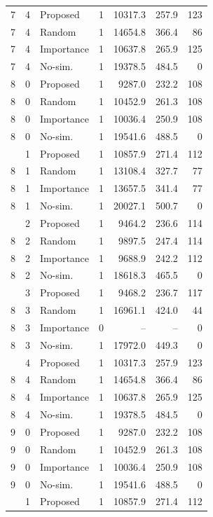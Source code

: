 \begin{table}[t]
\begin{tabular}{cc l c r r r}
7 & 4 & Proposed & 1 & 10317.3 & 257.9 & 123 \\
7 & 4 & Random & 1 & 14654.8 & 366.4 & 86 \\
7 & 4 & Importance & 1 & 10637.8 & 265.9 & 125 \\
7 & 4 & No-sim. & 1 & 19378.5 & 484.5 & 0 \\
\midrule
8 & 0 & Proposed & 1 & 9287.0 & 232.2 & 108 \\
8 & 0 & Random & 1 & 10452.9 & 261.3 & 108 \\
8 & 0 & Importance & 1 & 10036.4 & 250.9 & 108 \\
8 & 0 & No-sim. & 1 & 19541.6 & 488.5 & 0 \\
\addlinespace[1pt]
8 & 1 & Proposed & 1 & 10857.9 & 271.4 & 112 \\
8 & 1 & Random & 1 & 13108.4 & 327.7 & 77 \\
8 & 1 & Importance & 1 & 13657.5 & 341.4 & 77 \\
8 & 1 & No-sim. & 1 & 20027.1 & 500.7 & 0 \\
\addlinespace[1pt]
8 & 2 & Proposed & 1 & 9464.2 & 236.6 & 114 \\
8 & 2 & Random & 1 & 9897.5 & 247.4 & 114 \\
8 & 2 & Importance & 1 & 9688.9 & 242.2 & 112 \\
8 & 2 & No-sim. & 1 & 18618.3 & 465.5 & 0 \\
\addlinespace[1pt]
8 & 3 & Proposed & 1 & 9468.2 & 236.7 & 117 \\
8 & 3 & Random & 1 & 16961.1 & 424.0 & 44 \\
8 & 3 & Importance & 0 & -- & -- & 0 \\
8 & 3 & No-sim. & 1 & 17972.0 & 449.3 & 0 \\
\addlinespace[1pt]
8 & 4 & Proposed & 1 & 10317.3 & 257.9 & 123 \\
8 & 4 & Random & 1 & 14654.8 & 366.4 & 86 \\
8 & 4 & Importance & 1 & 10637.8 & 265.9 & 125 \\
8 & 4 & No-sim. & 1 & 19378.5 & 484.5 & 0 \\
\midrule
9 & 0 & Proposed & 1 & 9287.0 & 232.2 & 108 \\
9 & 0 & Random & 1 & 10452.9 & 261.3 & 108 \\
9 & 0 & Importance & 1 & 10036.4 & 250.9 & 108 \\
9 & 0 & No-sim. & 1 & 19541.6 & 488.5 & 0 \\
\addlinespace[1pt]
9 & 1 & Proposed & 1 & 10857.9 & 271.4 & 112 \\

\end{tabular}
\end{table}
